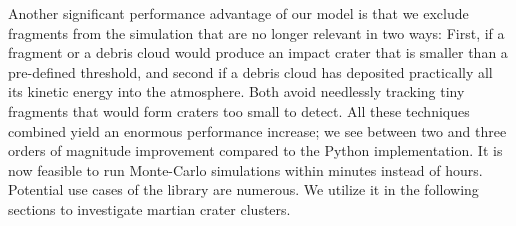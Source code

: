 Another significant performance advantage of our model is that we exclude fragments from the simulation that are no longer relevant in two ways: First, if a fragment or a debris cloud would produce an impact crater that is smaller than a pre-defined threshold, and second if a debris cloud has deposited practically all its kinetic energy into the atmosphere. Both avoid needlessly tracking tiny fragments that would form craters too small to detect. 
All these techniques combined yield an enormous performance increase; we see between two and three orders of magnitude improvement compared to the Python implementation.
It is now feasible to run Monte-Carlo simulations within minutes instead of hours. Potential use cases of the library are numerous. We utilize it in the following sections to investigate martian crater clusters.
